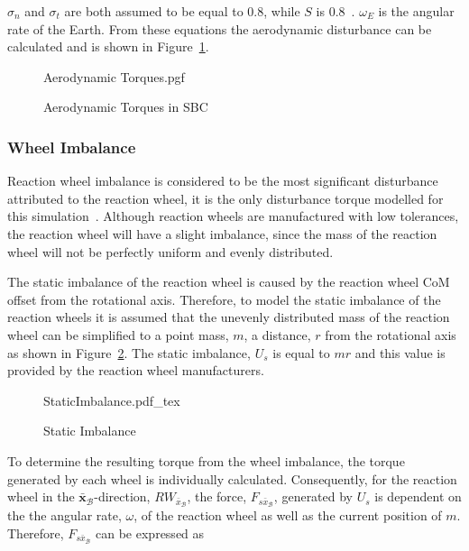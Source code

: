 $\sigma_n$ and $\sigma_t$ are both assumed to be equal to 0.8, while $S$ is $\num{0.8}$~\cite{steyn2011CubeSat}. $\omega_E$ is the angular rate of the Earth. From these equations the aerodynamic disturbance can be calculated and is shown in Figure~\ref{fig:AerodynamicTorques}.
\begin{figure}[!htb]
	\centering
	\def\pgfwidth{10cm}
	{Aerodynamic Torques.pgf}
	
	\caption{Aerodynamic Torques in SBC}
	\label{fig:AerodynamicTorques}
\end{figure}

\subsubsection{Wheel Imbalance}
\label{section:wheelImbalance}
Reaction wheel imbalance is considered to be the most significant disturbance attributed to the reaction wheel, it is the only disturbance torque modelled for this simulation~\cite{bialke1998high}. Although reaction wheels are manufactured with low tolerances, the reaction wheel will have a slight imbalance, since the mass of the reaction wheel will not be perfectly uniform and evenly distributed. 

The static imbalance of the reaction wheel is caused by the reaction wheel CoM offset from the rotational axis. Therefore, to model the static imbalance of the reaction wheels it is assumed that the unevenly distributed mass of the reaction wheel can be simplified to a point mass, $m$, a distance, $r$ from the rotational axis as shown in Figure~\ref{fig:StaticImbalance}. The static imbalance, $U_s$ is equal to $mr$ and this value is provided by the reaction wheel manufacturers.

\begin{figure}[!htb]
	\centering
	\def\svgwidth{10cm}
	{StaticImbalance.pdf_tex}
	\caption{Static Imbalance}
	\label{fig:StaticImbalance}
\end{figure}

To determine the resulting torque from the wheel imbalance, the torque generated by each wheel is individually calculated. Consequently, for the reaction wheel in the $\bar{\mathbf{x}}_\mathcal{B}$-direction, $RW_{\bar{x}_\mathcal{B}}$, the force, $F_{s\bar{x}_\mathcal{B}}$, generated by $U_s$ is dependent on the the angular rate, $\omega$, of the reaction wheel as well as the current position of $m$. Therefore, $F_{s\bar{x}_\mathcal{B}}$ can be expressed as

